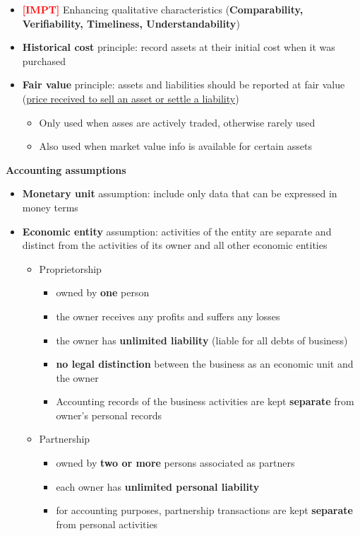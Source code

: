 \documentclass{article}
\newcommand{\impt}[0]{\textcolor{red}{\textbf{[IMPT] }}}
\begin{document}
\begin{multicols}{2}
\begin{itemize}
	\item \impt Enhancing qualitative characteristics (\textbf{Comparability, Verifiability, Timeliness, Understandability})
	\item \textbf{Historical cost} principle: record assets at their initial cost when it was purchased
	\item \textbf{Fair value} principle: assets and liabilities should be reported at fair value (\underline{price received to sell an asset or settle a liability})
	\begin{itemize}
		\item Only used when asses are actively traded, otherwise rarely used
		\item Also used when market value info is available for certain assets\\
	\end{itemize}
\end{itemize}
\textbf{Accounting assumptions}
\begin{itemize}
	\item \textbf{Monetary unit} assumption: include only data that can be expressed in money terms
	\item \textbf{Economic entity} assumption: activities of the entity are separate and distinct from the activities of its owner and all other economic entities
	\begin{itemize}
		\item Proprietorship
		\begin{itemize}
			\item owned by \textbf{one} person
			\item the owner receives any profits and suffers any losses
			\item the owner has \textbf{unlimited liability} (liable for all debts of business)
			\item \textbf{no legal distinction} between the business as an economic unit and the owner
			\item Accounting records of the business activities are kept \textbf{separate} from owner's personal records
		\end{itemize}
		\item Partnership
		\begin{itemize}
			\item owned by \textbf{two or more} persons associated as partners
			\item each owner has \textbf{unlimited personal liability}
			\item for accounting purposes, partnership transactions are kept \textbf{separate} from personal activities

\end{itemize}
\end{itemize}
\end{itemize}
\end{multicols}
\end{document}
